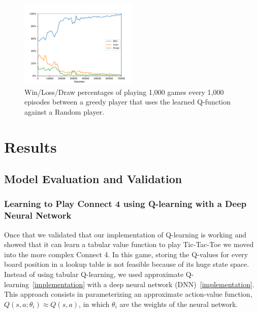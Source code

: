 \documentclass{article}
\newcommand{\GithubURL}[1]{[\href{https://github.com/davidrobles/mlnd-capstone-code/blob/master/#1}{implementation}]}
\begin{document}
\begin{figure}[!h]
    \centering
    \includegraphics[width=0.50\textwidth]{figures/tic_ql_tab_full_selfplay_wld_plot.pdf}
    \caption{Win/Loss/Draw percentages of playing 1,000 games every 1,000 episodes
             between a greedy player that uses the learned Q-function against a Random player.}
    \label{fig:tic-ql-tab-full-selfplay-wld-plot}
\end{figure}


\section{Results}

\subsection{Model Evaluation and Validation}

\subsubsection{Learning to Play Connect 4 using Q-learning with a Deep Neural Network}

Once that we validated that our implementation of Q-learning is working and showed that it can learn
a tabular value function to play Tic-Tac-Toe we moved into the more complex Connect 4. In this game,
storing the Q-values for every board position in a lookup table is not feasible because of its huge
state space. Instead of using tabular Q-learning, we used approximate
Q-learning~\GithubURL{capstone/rl/learners/qlearning_approx.py} with a deep neural network
(DNN)~\GithubURL{capstone/rl/value_functions/c4deepnetwork.py}. This approach consists in
parameterizing an approximate action-value function, $Q(s,a;\theta_i) \approx Q(s,a)$, in which
$\theta_i$ are the weights of the neural network.
\end{document}

